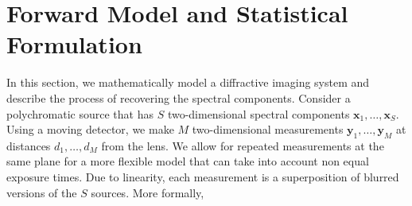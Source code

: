 \documentclass{article}
\begin{document}




\section{Forward Model and Statistical Formulation}
\label{sec:format}
In this section, we mathematically model a diffractive imaging
system and describe the process of recovering the spectral components. Consider
a polychromatic source that has $S$ two-dimensional spectral components
$\bm{x}_1, \dots, \bm{x}_S$. Using a moving detector, we make $M$
two-dimensional measurements $\bm{y}_1, \dots, \bm{y}_M$ at distances $d_1,
\dots, d_M$ from the lens. We allow for repeated measurements at the same plane
for a more flexible model that can take into account non equal exposure times.
Due to linearity, each measurement is a superposition of blurred versions
of the $S$ sources. More formally,
\end{document}
